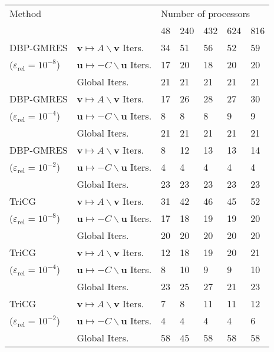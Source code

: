 \begin{tabular}{lllllll}
\hline 
Method &  & \multicolumn{5}{l}{Number of processors} \\\cline{3-7}
 &  & 48 & 240 & 432 & 624 & 816 \\
\hline 
DBP-GMRES & $\boldsymbol{v}\mapsto A\backslash \boldsymbol{v}$ Iters. & 34 & 51 & 56 & 52 & 59 \\
($\varepsilon_\mathrm{rel}=10^{-8}$) & $\boldsymbol{u}\mapsto -C\backslash \boldsymbol{u}$ Iters. & 17 & 20 & 18 & 20 & 20 \\
 & Global Iters. & 21 & 21 & 21 & 21 & 21 \\\cline{2-7}
DBP-GMRES & $\boldsymbol{v}\mapsto A\backslash \boldsymbol{v}$ Iters. & 17 & 26 & 28 & 27 & 30 \\
($\varepsilon_\mathrm{rel}=10^{-4}$) & $\boldsymbol{u}\mapsto -C\backslash \boldsymbol{u}$ Iters. & 8 & 8 & 8 & 9 & 9 \\
 & Global Iters. & 21 & 21 & 21 & 21 & 21 \\\cline{2-7}
DBP-GMRES & $\boldsymbol{v}\mapsto A\backslash \boldsymbol{v}$ Iters. & 8 & 12 & 13 & 13 & 14 \\
($\varepsilon_\mathrm{rel}=10^{-2}$) & $\boldsymbol{u}\mapsto -C\backslash \boldsymbol{u}$ Iters. & 4 & 4 & 4 & 4 & 4 \\
 & Global Iters. & 23 & 23 & 23 & 23 & 23 \\\cline{2-7}
TriCG & $\boldsymbol{v}\mapsto A\backslash \boldsymbol{v}$ Iters. & 31 & 42 & 46 & 45 & 52 \\
($\varepsilon_\mathrm{rel}=10^{-8}$) & $\boldsymbol{u}\mapsto -C\backslash \boldsymbol{u}$ Iters. & 17 & 18 & 19 & 19 & 20 \\
 & Global Iters. & 20 & 20 & 20 & 20 & 20 \\\cline{2-7}
TriCG & $\boldsymbol{v}\mapsto A\backslash \boldsymbol{v}$ Iters. & 12 & 18 & 19 & 20 & 21 \\
($\varepsilon_\mathrm{rel}=10^{-4}$) & $\boldsymbol{u}\mapsto -C\backslash \boldsymbol{u}$ Iters. & 8 & 10 & 9 & 9 & 10 \\
 & Global Iters. & 23 & 25 & 27 & 21 & 23 \\\cline{2-7}
TriCG & $\boldsymbol{v}\mapsto A\backslash \boldsymbol{v}$ Iters. & 7 & 8 & 11 & 11 & 12 \\
($\varepsilon_\mathrm{rel}=10^{-2}$) & $\boldsymbol{u}\mapsto -C\backslash \boldsymbol{u}$ Iters. & 4 & 4 & 4 & 4 & 6 \\
 & Global Iters. & 58 & 45 & 58 & 58 & 58 \\\cline{2-7}

\end{tabular}
